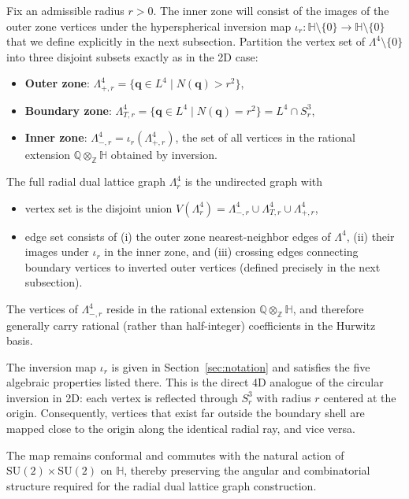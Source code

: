 \documentclass{article}
\begin{document}
Fix an admissible radius \(r > 0\). The inner zone will consist of the images of the outer zone vertices under the hyperspherical inversion map $\iota_r : \mathbb{H} \setminus \{0\} \to \mathbb{H} \setminus \{0\}$ that we define explicitly in the next subsection. Partition the vertex set of \(\Lambda^4 \setminus \{0\}\) into three disjoint subsets exactly as in the 2D case:
\begin{itemize}
  \item \textbf{Outer zone}: \(\Lambda_{+,r}^4 = \{ \mathbf{q} \in L^4 \mid N(\mathbf{q}) > r^2 \}\),
  \item \textbf{Boundary zone}: \(\Lambda_{T,r}^4 = \{ \mathbf{q} \in L^4 \mid N(\mathbf{q}) = r^2 \} = L^4 \cap S_r^3\),
  \item \textbf{Inner zone}: \(\Lambda_{-,r}^4 = \iota_r(\Lambda_{+,r}^4)\), the set of all vertices in the rational extension \(\mathbb{Q} \otimes_{\mathbb{Z}} \mathbb{H}\) obtained by inversion.
\end{itemize}
The full radial dual lattice graph $\Lambda_r^4$ is the undirected graph with
\begin{itemize}
  \item vertex set is the disjoint union $V(\Lambda_r^4) = \Lambda_{-,r}^4 \cup \Lambda_{T,r}^4 \cup \Lambda_{+,r}^4$,
  \item edge set consists of (i) the outer zone nearest-neighbor edges of $\Lambda^4$, (ii) their images under $\iota_r$ in the inner zone, and (iii) crossing edges connecting boundary vertices to inverted outer vertices (defined precisely in the next subsection).
\end{itemize}
The vertices of $\Lambda_{-,r}^4$ reside in the rational extension $\mathbb{Q} \otimes_{\mathbb{Z}} \mathbb{H}$, and therefore generally carry rational (rather than half-integer) coefficients in the Hurwitz basis.

The inversion map $\iota_r$ is given in Section~\ref{sec:notation} and satisfies the five algebraic properties listed there. This is the direct 4D analogue of the circular inversion in 2D: each vertex is reflected through $S_r^3$ with radius $r$ centered at the origin. Consequently, vertices that exist far outside the boundary shell are mapped close to the origin along the identical radial ray, and vice versa.

The map remains conformal and commutes with the natural action of $\mathrm{SU}(2) \times \mathrm{SU}(2)$ on $\mathbb{H}$, thereby preserving the angular and combinatorial structure required for the radial dual lattice graph construction.
\end{document}
